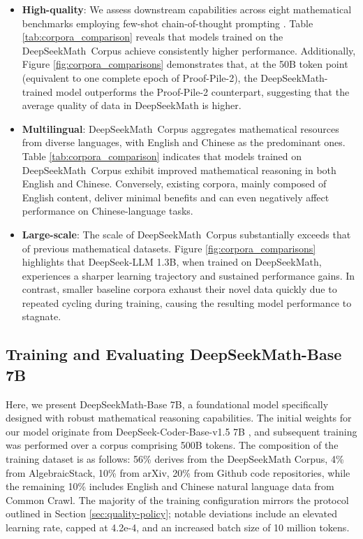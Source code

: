 \begin{itemize}[topsep=0pt]
    \item \textbf{High-quality}:
    We assess downstream capabilities across eight mathematical benchmarks employing few-shot chain-of-thought prompting \cite{cot}. Table \ref{tab:corpora_comparison} reveals that models trained on the DeepSeekMath~Corpus achieve consistently higher performance. Additionally, Figure \ref{fig:corpora_comparisons} demonstrates that, at the 50B token point (equivalent to one complete epoch of Proof-Pile-2), the DeepSeekMath-trained model outperforms the Proof-Pile-2 counterpart, suggesting that the average quality of data in DeepSeekMath is higher.
    \item \textbf{Multilingual}:
    DeepSeekMath~Corpus aggregates mathematical resources from diverse languages, with English and Chinese as the predominant ones. Table \ref{tab:corpora_comparison} indicates that models trained on DeepSeekMath~Corpus exhibit improved mathematical reasoning in both English and Chinese. Conversely, existing corpora, mainly composed of English content, deliver minimal benefits and can even negatively affect performance on Chinese-language tasks.
    \item \textbf{Large-scale}:
    The scale of DeepSeekMath~Corpus substantially exceeds that of previous mathematical datasets. Figure \ref{fig:corpora_comparisons} highlights that DeepSeek-LLM 1.3B, when trained on DeepSeekMath, experiences a sharper learning trajectory and sustained performance gains. In contrast, smaller baseline corpora exhaust their novel data quickly due to repeated cycling during training, causing the resulting model performance to stagnate.
\end{itemize}

\subsection{Training and Evaluating DeepSeekMath-Base 7B}

Here, we present DeepSeekMath-Base 7B, a foundational model specifically designed with robust mathematical reasoning capabilities. The initial weights for our model originate from DeepSeek-Coder-Base-v1.5 7B \citep{deepseek-coder}, and subsequent training was performed over a corpus comprising 500B tokens. The composition of the training dataset is as follows: 56\% derives from the DeepSeekMath Corpus, 4\% from AlgebraicStack, 10\% from arXiv, 20\% from Github code repositories, while the remaining 10\% includes English and Chinese natural language data from Common Crawl. The majority of the training configuration mirrors the protocol outlined in Section \ref{sec:quality-policy}; notable deviations include an elevated learning rate, capped at 4.2e-4, and an increased batch size of 10 million tokens.

